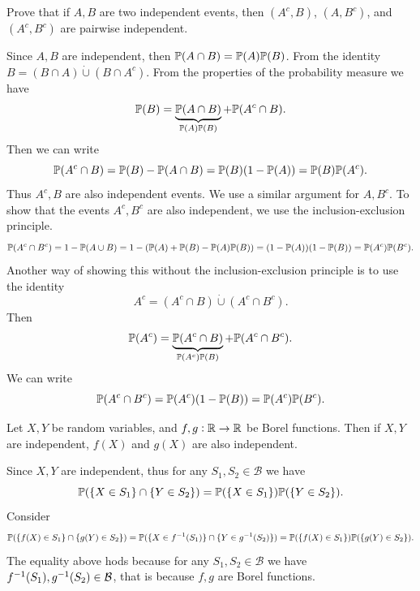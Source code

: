 \begin{problem}
	Prove that if $ A,B $ are two independent events, then $ (A^c, B) $, $ (A,B^c) $, and $ (A^c, B^c) $ are pairwise independent.
\end{problem}
\begin{solution}
	Since $ A,B $ are independent, then $ \mathbb{P}(A\cap B) = \mathbb{P}(A) \mathbb{P}(B)$. From the identity $ B = (B\cap A) \dot\cup (B\cap A^c) $. From the properties of the probability measure we have
	\[ \mathbb{P}(B) = \underbrace{\mathbb{P}(A\cap B)}_{\mathbb{P}(A)\mathbb{P}(B)} + \mathbb{P}(A^c \cap B). \]
	Then we can write
	\[ \mathbb{P}(A^c\cap B) = \mathbb{P}(B) - \mathbb{P}(A\cap B) = \mathbb{P}(B) (1-\mathbb{P}(A)) = \mathbb{P}(B)\mathbb{P}(A^c). \]
	Thus $ A^c,B $ are also independent events. We use a similar argument for $ A,B^c $. To show that the events $ A^c, B^c $ are also independent, we use the inclusion-exclusion principle. 
	\[ \mathbb{P}(A^c\cap B^c) = 1 - \mathbb{P}(A\cup B) = 1 - (\mathbb{P}(A)+\mathbb{P}(B) - \mathbb{P}(A)\mathbb{P}(B)) = (1-\mathbb{P}(A))(1-\mathbb{P}(B))=\mathbb{P}(A^c)\mathbb{P}(B^c). \]
	Another way of showing this without the inclusion-exclusion principle is to use the identity
	\[ A^c = (A^c\cap B) \dot\cup (A^c\cap B^c). \]
	Then 
	\[ \mathbb{P}(A^c) = \underbrace{\mathbb{P}(A^c\cap B)}_{\mathbb{P}(A^c)\mathbb{P}(B)} + \mathbb{P}(A^c\cap B^c). \]
	We can write
	\[ \mathbb{P}(A^c \cap B^c) = \mathbb{P}(A^c)(1-\mathbb{P}(B)) = \mathbb{P}(A^c) \mathbb{P}(B^c).  \]
\end{solution}
\begin{problem}
	Let $ X,Y $ be random variables, and $ f,g : \mathbb{R} \to \mathbb{R} $ be Borel functions. Then if $ X,Y $ are independent, $ f(X) $ and $ g(X) $ are also independent.
\end{problem}
\begin{solution}
	Since $ X,Y $ are independent, thus for any $ S_1,S_2 \in \mathcal{B} $ we have
	\[ \mathbb{P}(\{X \in S_1\}\cap \{Y\in S_2\}) = \mathbb{P}(\{X\in S_1\}) \mathbb{P}(\{Y \in S_2\}). \]
	Consider
	\[ \mathbb{P}(\{f(X) \in S_1\} \cap \{g(Y) \in S_2\})=\mathbb{P}(\{X \in f^{-1}(S_1)\} \cap \{Y \in g^{-1}(S_2)\}) = \mathbb{P}(\{f(X) \in S_1\}) \mathbb{P}(\{g(Y) \in S_2\}). \]
	The equality above hods because for any $ S_1, S_2 \in \mathcal{B} $ we have $ f^{-1}(S_1),g^{-1}(S_2) \in \mathcal{B} $, that is because $ f,g $ are Borel functions.
\end{solution}

